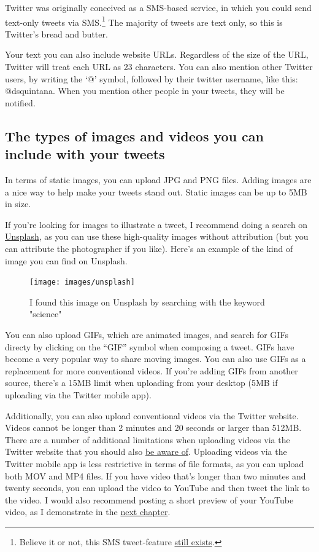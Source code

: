 \documentclass[]{book}
\let\rmarkdownfootnote\footnote%
\def\footnote{\protect\rmarkdownfootnote}
\begin{document}
Twitter was originally conceived as a SMS-based service, in which you could send text-only tweets via SMS.\footnote{Believe it or not, this SMS tweet-feature \href{https://help.twitter.com/en/using-twitter/twitter-sms}{still exists}.} The majority of tweets are text only, so this is Twitter's bread and butter.

Your text you can also include website URLs. Regardless of the size of the URL, Twitter will treat each URL as 23 characters. You can also mention other Twitter users, by writing the `@' symbol, followed by their twitter username, like this: @dsquintana. When you mention other people in your tweets, they will be notified.

\hypertarget{the-types-of-images-and-videos-you-can-include-with-your-tweets}{%
\subsection{The types of images and videos you can include with your tweets}\label{the-types-of-images-and-videos-you-can-include-with-your-tweets}}

In terms of static images, you can upload JPG and PNG files. Adding images are a nice way to help make your tweets stand out. Static images can be up to 5MB in size.

If you're looking for images to illustrate a tweet, I recommend doing a search on \href{https://unsplash.com/}{Unsplash}, as you can use these high-quality images without attribution (but you can attribute the photographer if you like). Here's an example of the kind of image you can find on Unsplash.

\begin{figure}

\texttt{[image: images/unsplash]} \hfill{}

\caption{I found this image on Unsplash by searching with the keyword "science"}\label{fig:unnamed-chunk-3}
\end{figure}

You can also upload GIFs, which are animated images, and search for GIFs directy by clicking on the ``GIF'' symbol when composing a tweet. GIFs have become a very popular way to share moving images. You can also use GIFs as a replacement for more conventional videos. If you're adding GIFs from another source, there's a 15MB limit when uploading from your desktop (5MB if uploading via the Twitter mobile app).

Additionally, you can also upload conventional videos via the Twitter website. Videos cannot be longer than 2 minutes and 20 seconds or larger than 512MB. There are a number of additional limitations when uploading videos via the Twitter website that you should also \href{https://help.twitter.com/en/using-twitter/twitter-videos}{be aware of}. Uploading videos via the Twitter mobile app is less restrictive in terms of file formats, as you can upload both MOV and MP4 files. If you have video that's longer than two minutes and twenty seconds, you can upload the video to YouTube and then tweet the link to the video. I would also recommend posting a short preview of your YouTube video, as I demonstrate in the \protect\hyperlink{composing-tweets}{next chapter}.
\end{document}
